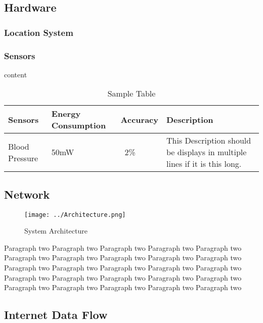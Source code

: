 \documentclass[10pt,journal,final,a4paper,nofonttune]{IEEEtran}
\begin{document}
\subsection{Hardware}

\subsubsection{Location System}
\subsubsection{Sensors} 

content

\begin{table}[h]
    \caption{Sample Table}
    \begin{center}
        \begin{tabular}{|p{1cm}|p{2cm}|p{1cm}|p{2cm}|}
            \hline
            Sensors & Energy Consumption & Accuracy & Description \\ \hline
            Blood Pressure & 50mW & ~2\% & This Description should be displays in multiple lines if it is this long. \\ 
            \hline
        \end{tabular}
    \end{center}
\end{table}


\subsection{Network}

\begin{figure}[!ht]
    \centering
    \begin{center}
        \caption{System Architecture}
    \end{center}
    \texttt{[image: ../Architecture.png]}
\end{figure}

Paragraph two Paragraph two Paragraph two Paragraph two Paragraph two 
Paragraph two Paragraph two Paragraph two Paragraph two Paragraph two 
Paragraph two Paragraph two Paragraph two Paragraph two Paragraph two 
Paragraph two Paragraph two Paragraph two Paragraph two Paragraph two 
Paragraph two Paragraph two Paragraph two Paragraph two Paragraph two 

\subsection{Internet Data Flow}
\end{document}
